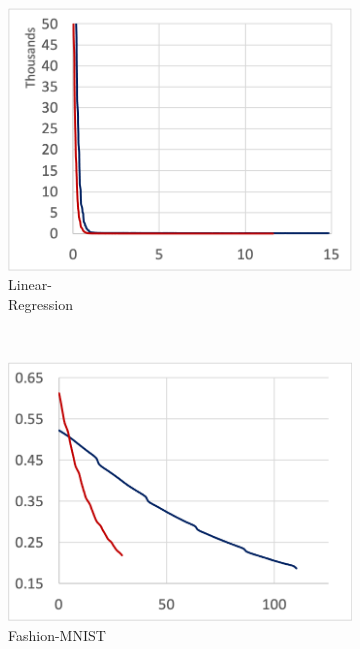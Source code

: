 \begin{figure}[!ht]
  \begin{subfigure}[t]{.22\textwidth}
    \includegraphics[width=\textwidth]{tf2-04}
    \caption{\small Linear-\\Regression}
  \end{subfigure} 
  ~ 
  \begin{subfigure}[t]{.22\textwidth}
    \includegraphics[width=\textwidth]{tf2-05}
    \caption{\small Fashion-MNIST}
  \end{subfigure}
  ~
  \begin{subfigure}[t]{.22\textwidth}

\end{subfigure}
\end{figure}
